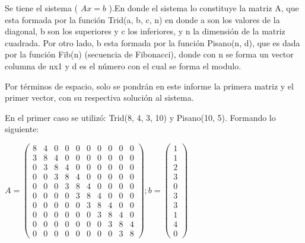 \documentclass[10pt,twoside]{article}
\begin{document}
\begin{flushleft}
\hspace{12mm}Se tiene el sistema
( $A x = b $ ).En donde el sistema lo constituye la matriz A, que esta formada por la función Trid(a, b, c, n) en donde a son los valores de la diagonal, b son los superiores y c los inferiores, y n la dimensión de la matriz cuadrada. Por otro lado, b esta formada por la función Pisano(n, d), que es dada por la función Fib(n) (secuencia de Fibonacci), donde con n se forma un vector columna de nx1 y d es el número con el cual se forma el modulo.\\
\end{flushleft}

Por términos de espacio, solo se pondrán en este informe la primera matriz y el primer vector, con su respectiva solución al sistema.


\begin{flushleft}
En el primer caso se utilizó: Trid(8, 4, 3, 10) y Pisano(10, 5). Formando lo siguiente:
\end{flushleft}

\vspace{5mm}
$
A = 
 \begin{pmatrix}
  8  & 4 &  0 &  0 &  0 &  0 &  0 &  0 &  0 &  0 \\
   3  & 8 &  4 &  0 &  0 &  0 &  0 &  0 &  0 &  0 \\
   0 &  3 &  8 &  4 &  0 &  0 &  0 &  0 &  0 &  0 \\
   0  & 0 &  3 &  8 &  4 &  0 &  0 &  0 &  0 &  0 \\
   0  & 0 &  0 &  3 &  8 &  4 &  0 &  0 &  0 &  0 \\
   0 &  0 &  0 &  0 &  3 &  8 &  4 &  0 &  0 &  0 \\
   0  & 0 &  0 &  0 &  0 &  3  & 8 &  4 &  0 &  0 \\ 
   0 &  0  & 0 &  0 &  0 &  0 &  3 &  8 &  4 &  0 \\
   0 &  0  & 0 &  0 &  0 &  0 &  0 &  3 &  8 &  4 \\
   0  & 0 &  0 &  0 &  0 &  0 &  0 &  0 &  3 &  8 
 \end{pmatrix}
  ; b = \begin{pmatrix}
  1 \\
   1 \\
   2 \\
   3 \\
   0 \\
   3 \\
   3 \\
   1 \\
   4 \\
   0 
  \end{pmatrix}
 $
 \vspace{5mm}
 
\end{document}
